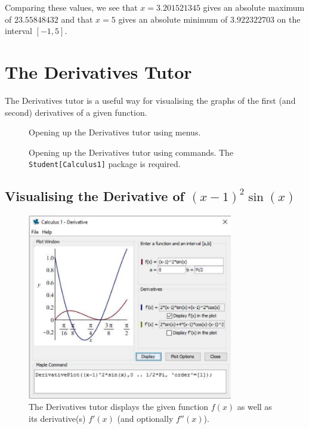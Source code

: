 Comparing these values, we see that $x=3.201521345$ gives an absolute maximum of $23.55848432$ and that $x=5$ gives an absolute minimum of $3.922322703$ on the interval $[-1,5]$.

\clearpage

\section{The Derivatives Tutor}


The Derivatives tutor is a useful way for visualising the graphs of the first (and second) derivatives of a given function.

\begin{figure}[h]
\caption{Opening up the Derivatives tutor using menus.}
\centering
{}
\end{figure}

\begin{figure}[h]
\caption{Opening up the Derivatives tutor using commands. The \texttt{Student[Calculus1]} package is required.}
\centering
{}
\end{figure}

\subsection{Visualising the Derivative of $(x-1)^2\sin(x)$}

\begin{figure}[h]
\caption{The Derivatives tutor displays the given function $f(x)$ as well as its derivative(s) $f'(x)$ (and optionally $f''(x)$).}
\centering
\includegraphics[width=0.8\textwidth]{tutorials/figures/DerivativeTutorQ1-1-eps-converted-to.pdf}
\vspace{-1cm}
\end{figure}

